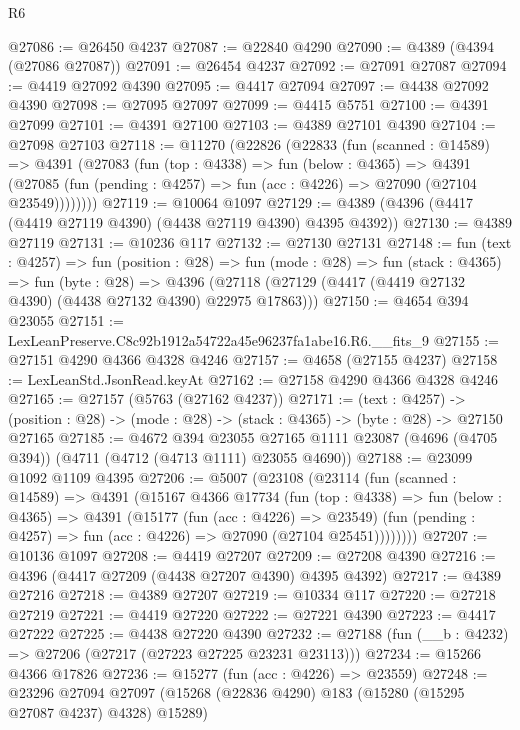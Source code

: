 \begin{lexlean}{R6}
\begin{coremodule}
@27086 := @26450 @4237
@27087 := @22840 @4290
@27090 := @4389 (@4394 (@27086 @27087))
@27091 := @26454 @4237
@27092 := @27091 @27087
@27094 := @4419 @27092 @4390
@27095 := @4417 @27094
@27097 := @4438 @27092 @4390
@27098 := @27095 @27097
@27099 := @4415 @5751
@27100 := @4391 @27099
@27101 := @4391 @27100
@27103 := @4389 @27101 @4390
@27104 := @27098 @27103
@27118 := @11270
    (@22826
      (@22833
        (fun (scanned : @14589) =>
        @4391
          (@27083
            (fun (top : @4338) =>
            fun (below : @4365) =>
            @4391
              (@27085 (fun (pending : @4257) => fun (acc : @4226) => @27090 (@27104 @23549))))))))
@27119 := @10064 @1097
@27129 := @4389 (@4396 (@4417 (@4419 @27119 @4390) (@4438 @27119 @4390) @4395 @4392))
@27130 := @4389 @27119
@27131 := @10236 @117
@27132 := @27130 @27131
@27148 := fun (text : @4257) =>
  fun (position : @28) =>
  fun (mode : @28) =>
  fun (stack : @4365) =>
  fun (byte : @28) =>
  @4396 (@27118 (@27129 (@4417 (@4419 @27132 @4390) (@4438 @27132 @4390) @22975 @17863)))
@27150 := @4654 @394 @23055
@27151 := LexLeanPreserve.C8c92b1912a54722a45e96237fa1abe16.R6.__fits_9
@27155 := @27151 @4290 @4366 @4328 @4246
@27157 := @4658 (@27155 @4237)
@27158 := LexLeanStd.JsonRead.keyAt
@27162 := @27158 @4290 @4366 @4328 @4246
@27165 := @27157 (@5763 (@27162 @4237))
@27171 := (text : @4257) ->
  (position : @28) -> (mode : @28) -> (stack : @4365) -> (byte : @28) -> @27150 @27165
@27185 := @4672
    @394
    @23055
    @27165
    @1111
    @23087
    (@4696 (@4705 @394))
    (@4711 (@4712 (@4713 @1111) @23055 @4690))
@27188 := @23099 @1092 @1109 @4395
@27206 := @5007
    (@23108
      (@23114
        (fun (scanned : @14589) =>
        @4391
          (@15167
            @4366
            @17734
            (fun (top : @4338) =>
            fun (below : @4365) =>
            @4391
              (@15177
                (fun (acc : @4226) => @23549)
                (fun (pending : @4257) => fun (acc : @4226) => @27090 (@27104 @25451))))))))
@27207 := @10136 @1097
@27208 := @4419 @27207
@27209 := @27208 @4390
@27216 := @4396 (@4417 @27209 (@4438 @27207 @4390) @4395 @4392)
@27217 := @4389 @27216
@27218 := @4389 @27207
@27219 := @10334 @117
@27220 := @27218 @27219
@27221 := @4419 @27220
@27222 := @27221 @4390
@27223 := @4417 @27222
@27225 := @4438 @27220 @4390
@27232 := @27188 (fun (__b : @4232) => @27206 (@27217 (@27223 @27225 @23231 @23113)))
@27234 := @15266 @4366 @17826
@27236 := @15277 (fun (acc : @4226) => @23559)
@27248 := @23296
    @27094
    @27097
    (@15268 (@22836 @4290) @183 (@15280 (@15295 @27087 @4237) @4328) @15289)

\end{coremodule}
\end{lexlean}
